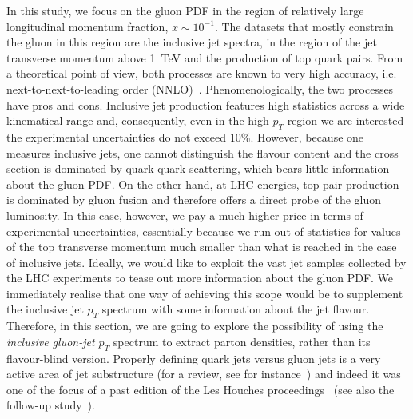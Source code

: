 In this study, we focus on the gluon PDF in the region of relatively large longitudinal momentum fraction, $x\sim 10^{-1}$. The datasets that mostly constrain the gluon in this region are the inclusive jet spectra, in the region of the jet transverse momentum above 1~TeV and the production of top quark pairs. From a theoretical point of view, both processes are known to very high accuracy, i.e. next-to-next-to-leading order (NNLO)~\cite{Czakon:2015owf,Currie:2016bfm}. Phenomenologically, the two processes have pros and cons. Inclusive jet production features high statistics across a wide kinematical range and, consequently, even in the high $p_T$ region we are interested the experimental uncertainties do not exceed 10\%. However, because one measures inclusive jets, one cannot distinguish the flavour content and the cross section is dominated by quark-quark scattering, which bears little information about the gluon PDF. 
%
On the other hand, at LHC energies, top pair production is dominated by gluon fusion and therefore offers a direct probe of the gluon luminosity. In this case, however, we pay a much higher price in terms of experimental uncertainties, essentially because we run out of statistics for values of the top transverse momentum much smaller than what is reached in the case of inclusive jets. 
%
Ideally, we would like to exploit the vast jet samples collected by the LHC experiments to tease out more information about the gluon PDF. We immediately realise that one way of achieving this scope would be to supplement the inclusive jet $p_T$ spectrum with some information about the jet flavour. 
%
Therefore, in this section, we are going to explore the possibility of using the \emph{inclusive gluon-jet $p_T$} spectrum to extract parton densities, rather than its flavour-blind version. Properly defining quark jets versus gluon jets is a very active area of jet substructure (for a review, see for instance~\cite{Marzani:2019hun}) and indeed it was one of the focus of a past edition of the Les Houches proceedings~\cite{Badger:2016bpw} (see also the follow-up study~\cite{Gras:2017jty}). 



